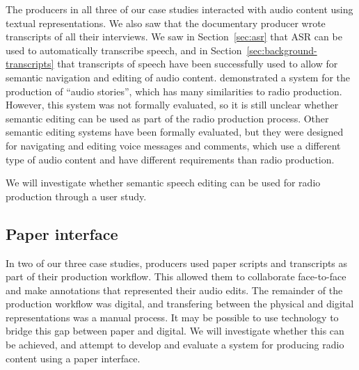The producers in all three of our case studies interacted with audio content using textual representations. We also saw
that the documentary producer wrote transcripts of all their interviews.  We saw in Section~\ref{sec:asr} that ASR can
be used to automatically transcribe speech, and in Section~\ref{sec:background-transcripts} that transcripts of speech
have been successfully used to allow for semantic navigation and editing of audio content.  \citet{Rubin2013}
demonstrated a system for the production of ``audio stories'', which has many similarities to radio production.
However, this system was not formally evaluated, so it is still unclear whether semantic editing can be used as part of
the radio production process. Other semantic editing systems have been formally evaluated, but they were designed for
navigating and editing voice messages and comments, which use a different type of audio content and have different
requirements than radio production.

We will investigate whether semantic speech editing can be used for radio production through a user study.

\subsection{Paper interface}

In two of our three case studies, producers used paper scripts and transcripts as part of their production workflow.
This allowed them to collaborate face-to-face and make annotations that represented their audio edits. The remainder of
the production workflow was digital, and transfering between the physical and digital representations was a manual
process. It may be possible to use technology to bridge this gap between paper and digital. We will investigate whether
this can be achieved, and attempt to develop and evaluate a system for producing radio content using a paper interface.
